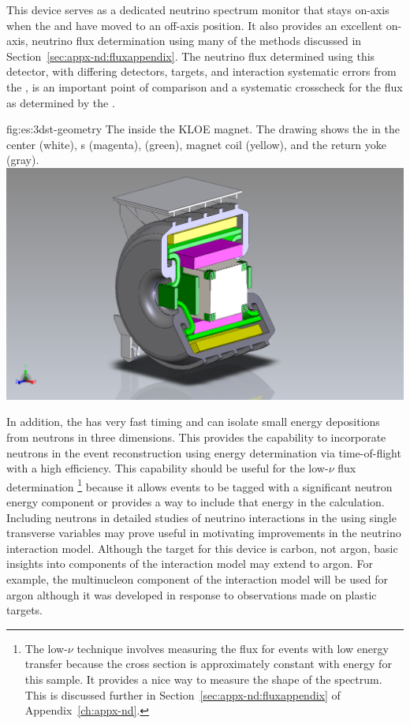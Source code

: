 This device serves as a dedicated  neutrino spectrum monitor that stays on-axis when the    and  have moved to an off-axis position. 
It also provides an excellent on-axis, neutrino flux determination using many of the methods discussed in Section~\ref{sec:appx-nd:fluxappendix}. The neutrino flux determined using this detector, with  differing detectors, targets, and interaction systematic errors from the , is an important point of comparison and a systematic crosscheck for the flux as determined by the .

\begin{dunefigure}{fig:es:3dst-geometry}
{The  inside the KLOE magnet. The drawing shows the  in the center (white), s (magenta),  (green), magnet coil (yellow), and the return yoke (gray).}
  \includegraphics[width=7.in]{graphics/3DST-KLOE2019-08-01.png}
\end{dunefigure}




In addition, the  has very fast timing and can isolate small energy depositions from neutrons in three dimensions.  This provides the capability to  incorporate neutrons in the event reconstruction using energy determination via time-of-flight with a high efficiency. This capability should be useful for the low-$\nu$ flux determination \footnote{The low-$\nu$ technique involves measuring the flux for events with low energy transfer because the cross section is approximately constant with energy for this sample.  It provides a nice way to measure the shape of the spectrum.  This is discussed further in Section~\ref{sec:appx-nd:fluxappendix} of Appendix~\ref{ch:appx-nd}.} because it allows events to be tagged with a significant neutron energy component or provides a way to include that energy in the calculation.  Including neutrons in detailed studies of neutrino interactions in the  using single transverse variables may prove useful in motivating improvements in the neutrino interaction model. Although the target for this device is carbon, not argon, basic insights into components of the interaction model may extend to argon.  For example, the multinucleon component of the interaction model will be used for argon although it was developed in response to observations made on plastic targets.   



